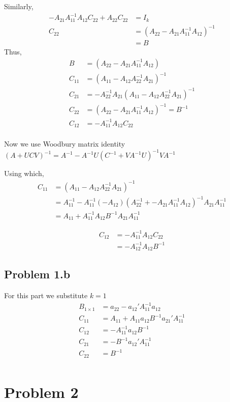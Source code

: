 \documentclass[a4paper]{article}
\begin{document}
Similarly,
\begin{align*}
-A_{21}A_{11}^{-1}A_{12}C_{22}+A_{22}C_{22} &= I_k\\
C_{22} &=  (A_{22}-A_{21}A_{11}^{-1}A_{12})^{-1}\\
&=B
\end{align*}
Thus, 
\begin{align*}
B &= (A_{22}-A_{21}A_{11}^{-1}A_{12})\\
C_{11} &=(A_{11}-A_{12}A_{22}^{-1}A_{21})^{-1} \\
C_{21}&= -A_{22}^{-1}A_{21}(A_{11}-A_{12}A_{22}^{-1}A_{21})^{-1}\\
C_{22}&= (A_{22}-A_{21}A_{11}^{-1}A_{12})^{-1} = B^{-1}\\
C_{12} &= -A_{11}^{-1}A_{12}C_{22}\\
\end{align*}

Now we use Woodbury matrix identity $(A+UCV )^{-1}= A^{-1}-A^{-1}U(C^{-1}+VA^{-1}U)^{-1}VA^{-1}$

Using which, \begin{align*}
C_{11} &= (A_{11}-A_{12}A_{22}^{-1}A_{21})^{-1}\\ 
&= A_{11}^{-1}-A_{11}^{-1}(-A_{12})(A_{22}^{-1} + -A_{21}A_{11}^{-1}A_{12} )^{-1}A_{21}A_{11}^{-1}\\  
&= A_{11}+A_{11}^{-1}A_{12}B^{-1}A_{21}A_{11}^{-1}
\end{align*}

\begin{align*}C_{12} &= -A_{11}^{-1}A_{12}C_{22}\\
&= -A_{12}^{-1}A_{12}B^{-1} \end{align*}

\subsection*{Problem 1.b}
For this part we substitute $k=1$  
\begin{align*}
B_{1 \times 1} &= a_{22}-a_{12}'A_{11}^{-1}a_{12}\\
C_{11} &= A_{11}+A_{11}a_{12}B^{-1}a_{21}'A_{11}^{-1}\\
C_{12}&=-A_{11}^{-1}a_{12}B^{-1}\\ 
C_{21}&= -B^{-1}a_{12}'A_{11}^{-1}\\
C_{22}&=B^{-1}\\
\end{align*}


\section*{Problem 2}
\end{document}
